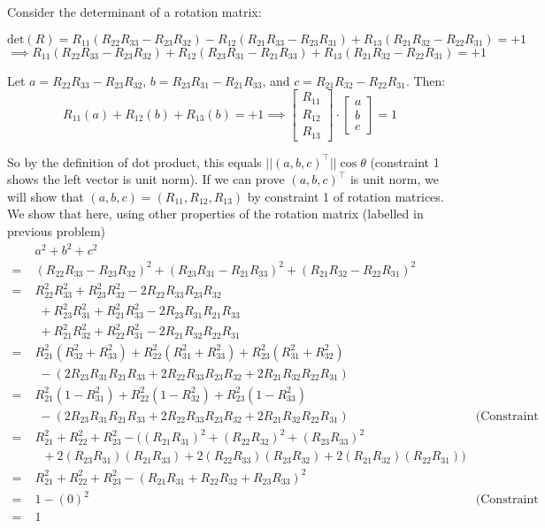 \documentclass[english]{article}
\begin{document}
Consider the determinant of a rotation matrix:

\[ \mathrm{det}(R) = R_{11}(R_{22}R_{33} - R_{23}R_{32}) - R_{12}(R_{21}R_{33} - R_{23}R_{31}) + R_{13}(R_{21}R_{32} - R_{22}R_{31})= +1 \]
\[ \implies R_{11}(R_{22}R_{33} - R_{23}R_{32}) + R_{12}(R_{23}R_{31} - R_{21}R_{33}) + R_{13}(R_{21}R_{32} - R_{22}R_{31})= +1 \]

Let $a = R_{22}R_{33} - R_{23}R_{32}$, $b = R_{23}R_{31} - R_{21}R_{33}$, and $c = R_{21}R_{32} - R_{22}R_{31}$. Then:
\[ R_{11}(a) + R_{12}(b) + R_{13}(b) = +1 \implies
\begin{bmatrix}
	R_{11} \\
	R_{12} \\
	R_{13}
\end{bmatrix} \cdot \begin{bmatrix}
	a \\
	b \\ 
	c
\end{bmatrix} = 1 \] 

So by the definition of dot product, this equals $||(a,b,c)^\top||\cos \theta$ (constraint 1 shows the left vector is unit norm). If we can prove $(a,b,c)^\top$ is unit norm, we will show that $(a,b,c) = (R_{11},R_{12},R_{13})$ by constraint 1 of rotation matrices. We show that here, using other properties of the rotation matrix (labelled in previous problem)
\begin{align*}
 &\; a^2 + b^2 + c^2 \\
=&\; (R_{22}R_{33} - R_{23}R_{32})^2 + (R_{23}R_{31} - R_{21}R_{33})^2 + (R_{21}R_{32} - R_{22}R_{31})^2 \\
=&\; R_{22}^2R_{33}^2 + R_{23}^2R_{32}^2 - 2 R_{22}R_{33}R_{23}R_{32}  \\
 &\;\; + R_{23}^2R_{31}^2 + R_{21}^2R_{33}^2 - 2R_{23}R_{31}R_{21}R_{33} \\
 &\;\; + R_{21}^2R_{32}^2 + R_{22}^2R_{31}^2 - 2R_{21}R_{32}R_{22}R_{31} \\
=&\; R_{21}^2(R_{32}^2 + R_{33}^2) + R_{22}^2(R_{31}^2 + R_{33}^2) + R_{23}^2(R_{31}^2 + R_{32}^2) \\
 &\;\;  - (2R_{23}R_{31}R_{21}R_{33} + 2 R_{22}R_{33}R_{23}R_{32} + 2R_{21}R_{32}R_{22}R_{31}) \\
=&\; R_{21}^2(1 - R_{31}^2) + R_{22}^2(1 - R_{32}^2) + R_{23}^2(1 - R_{33}^2) \\
 &\;\;  - (2R_{23}R_{31}R_{21}R_{33} + 2 R_{22}R_{33}R_{23}R_{32} + 2R_{21}R_{32}R_{22}R_{31}) & \textrm{(Constraint 3.)} \\
=&\; R_{21}^2  + R_{22}^2 + R_{23}^2 - ((R_{21}R_{31})^2 + (R_{22}R_{32})^2 + (R_{23}R_{33})^2 \\
 &\;\;\; + 2(R_{23}R_{31})(R_{21}R_{33}) + 2(R_{22}R_{33})(R_{23}R_{32}) + 2(R_{21}R_{32})(R_{22}R_{31})) \\
=&\; R_{21}^2  + R_{22}^2 + R_{23}^2 - (R_{21}R_{31} + R_{22}R_{32} + R_{23}R_{33})^2 \\
=&\; 1 - (0)^2 & \textrm{(Constraint 2 and property below)} \\
=&\; 1 \\
\end{align*}
\end{document}
